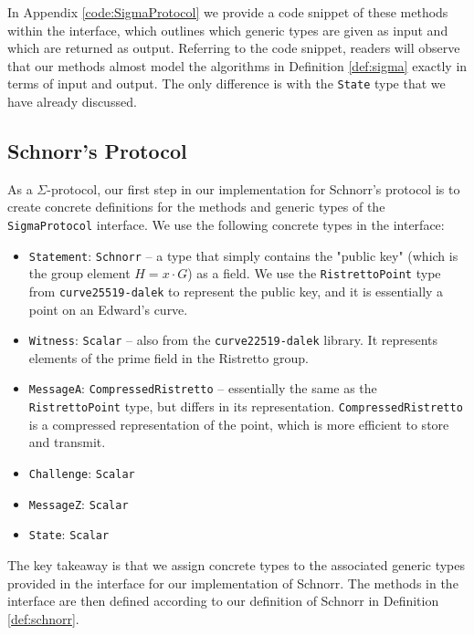 In Appendix \ref{code:SigmaProtocol} we provide a code snippet of these methods within 
the interface, which outlines which generic types are given as input and which are 
returned as output. Referring to the code snippet, readers will observe that our 
methods almost model the algorithms in Definition \ref{def:sigma} exactly in terms of 
input and output. The only difference is with the \texttt{State} type that we have already 
discussed.

\subsection{Schnorr's Protocol}
As a $\Sigma$-protocol, our first step in our implementation for Schnorr's protocol is 
to create concrete definitions for 
the methods and generic types of the \texttt{SigmaProtocol} interface. We use the following 
concrete types in the interface: 
\begin{itemize}
  \item \texttt{Statement}: \texttt{Schnorr} -- a type that simply contains the "public key"
  (which is the group element $H = x \cdot G$) as a field. We use the \texttt{RistrettoPoint} 
  type from \texttt{curve25519-dalek} to represent the public key, and it is essentially a 
  point on an Edward's curve. 
  \item \texttt{Witness}: \texttt{Scalar} -- also from the \texttt{curve22519-dalek} library. It 
  represents elements of the prime field in the Ristretto group. 
  \item \texttt{MessageA}: \texttt{CompressedRistretto} -- essentially the same as the 
  \texttt{RistrettoPoint} type, but differs in its representation. \texttt{CompressedRistretto}
  is a compressed representation of the point, which is more efficient to store and
  transmit.
  \item \texttt{Challenge}: \texttt{Scalar}
  \item \texttt{MessageZ}: \texttt{Scalar}
  \item \texttt{State}: \texttt{Scalar} 
\end{itemize}

The key takeaway is that we assign concrete types to the associated generic types provided in 
the interface for our implementation of Schnorr. The methods in the interface are then 
defined according to our definition of Schnorr in Definition \ref{def:schnorr}. 